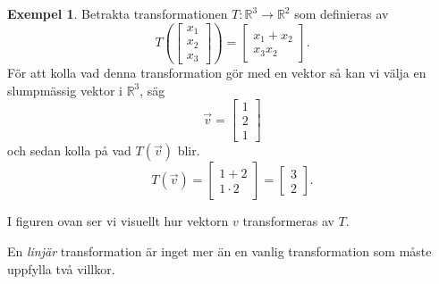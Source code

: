 \documentclass{article}
\theoremstyle{definition}
\newtheorem{exmp}[thm]{Exempel}
\begin{document}
\begin{exmp}
  Betrakta transformationen $T: \mathbb{R}^3 \rightarrow \mathbb{R}^2$ som definieras av 
\[T \left(
  \begin{bmatrix}
    x_1 \\
    x_2 \\
    x_3
  \end{bmatrix}
\right) = 
\begin{bmatrix}
  x_1 + x_2 \\
  x_3 x_2 
\end{bmatrix}.
\]
För att kolla vad denna transformation gör med en vektor 
så kan vi välja en slumpmässig vektor i $\mathbb{R}^3$, säg
\[\vec{v} = 
\begin{bmatrix}
  1 \\
  2 \\
  1
\end{bmatrix}
\]
och sedan kolla på vad $T(\vec{v})$ blir. 
\[T(\vec{v}) = 
\begin{bmatrix}
  1 + 2 \\
  1 \cdot 2
\end{bmatrix} = 
\begin{bmatrix}
  3 \\
  2
\end{bmatrix}.
\]

\begin{center}
\end{center}
I figuren ovan ser vi visuellt hur vektorn $v$ transformeras av $T$. 
\end{exmp}

En \textit{linjär} transformation är inget mer än en vanlig transformation som måste uppfylla två villkor. 
\end{document}
